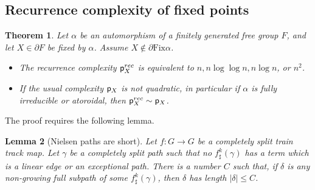 \documentclass[11pt]{amsart}
\newtheorem{thm}{Theorem}[section]
\newtheorem{lem}[thm]{Lemma}
\theoremstyle{remark}
\newcommand{\Fix}{{\mathrm{Fix}}}
\newcommand{\pr}{\cp^{rec}}
\newcommand{\cp}{{\sf  p}}
\newcommand{\bo}{\partial}
\begin{document}
\subsection{Recurrence complexity of fixed points}

\begin{thm} \label{compar3}
Let $\alpha$ be an automorphism of a finitely generated free group $F$, and let $X\in\bo F$ be fixed by $\alpha$. Assume $X\notin\bo\Fix\alpha$. 

\begin{itemize}
\item The recurrence complexity $\pr_X$ is equivalent to $n,n\log\log n, n\log n$, or $n^2$.
\item If the usual complexity   $\cp_X$ is not quadratic, in particular if $\alpha$ is fully irreducible or atoroidal, then 
$  \pr_X\sim \cp_X$. 
\end{itemize}
\end{thm}

 The proof requires the following lemma.

\begin{lem} [Nielsen paths are short] \label{long}
  Let $f:G\to G$ be a completely split train track map.
Let $\gamma$ be a completely split path such that no  $f^k_\sharp(\gamma)$ has a term which  is a linear edge or an exceptional path. There is a number $C$ such that, if   $\delta$ is any non-growing full subpath of some $f^k_\sharp(\gamma)$, then $\delta$ has length   $ | \delta | \le C$. 
\end{lem}  
\end{document}
